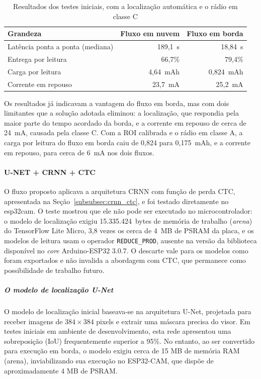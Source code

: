 \begin{table}[H]
    \centering
    \caption{Resultados dos testes iniciais, com a localização automática e o rádio em classe C}
    \label{tab:testes_iniciais}
    \begin{tabular}{@{}lrr@{}}
        \toprule
        \textbf{Grandeza} & \textbf{Fluxo em nuvem} & \textbf{Fluxo em borda} \\
        \midrule
        Latência ponta a ponta (mediana) & 189,1~s & 18,84~s \\
        Entrega por leitura & 66,7\% & 79,4\% \\
        Carga por leitura & 4,64~mAh & 0,824~mAh \\
        Corrente em repouso & 23,7~mA & 25,2~mA \\
        \bottomrule
    \end{tabular}
\end{table}

Os resultados já indicavam a vantagem do fluxo em borda, mas com dois limitantes que a
solução adotada eliminou: a localização, que respondia pela maior parte do tempo acordado da
borda, e a corrente em repouso de cerca de 24~mA, causada pela classe C. Com a ROI
calibrada e o rádio em classe A, a carga por leitura do fluxo em borda caiu de 0,824 para
0,175~mAh, e a corrente em repouso, para cerca de 6~mA nos dois fluxos.

\paragraph{U-NET + CRNN + CTC}
O fluxo proposto aplicava a arquitetura CRNN com função de perda CTC, apresentada na
Seção~\ref{subsubsec:crnn_ctc}, e foi testado diretamente no \gls{esp32cam}. O teste
mostrou que ele não pode ser executado no microcontrolador: o modelo de localização
exigiu 15.335.424~bytes de memória de trabalho (\textit{arena}) do TensorFlow Lite Micro,
3,8 vezes os cerca de 4~MB de PSRAM da placa, e os modelos de leitura usam o operador
\texttt{REDUCE\_PROD}, ausente na versão da biblioteca disponível no \textit{core}
Arduino-ESP32 3.0.7. O descarte vale para os modelos como foram exportados e não invalida
a abordagem com CTC, que permanece como possibilidade de trabalho futuro.

\subparagraph{O modelo de localização U-Net}
O modelo de localização inicial baseava-se na arquitetura U-Net, projetada para receber
imagens de \(384 \times 384\) pixels e extrair uma máscara precisa do visor. Em testes
iniciais em ambiente de desenvolvimento, esta rede apresentou uma sobreposição (IoU)
frequentemente superior a 95\%. No entanto, ao ser convertido para execução em borda,
o modelo exigiu cerca de 15 MB de memória RAM (arena), inviabilizando sua execução no
ESP32-CAM, que dispõe de aproximadamente 4 MB de PSRAM.

